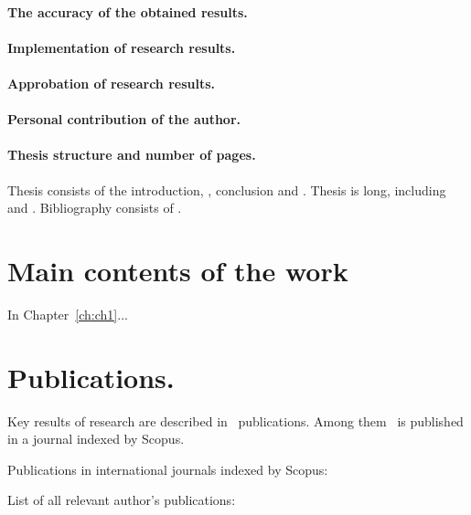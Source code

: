 \paragraph*{The accuracy of the obtained results.}

\paragraph*{Implementation of research results.}
\paragraph*{Approbation of research results.}
\paragraph*{Personal contribution of the author.}
\paragraph*{Thesis structure and number of pages.}

Thesis consists of the introduction,
,
conclusion and 
.
Thesis is 
 long, including
 and
.
Bibliography consists of
.


\newpage
\section*{Main contents of the work}

In Chapter~\ref{ch:ch1}...

\section*{Publications.}

Key results of research are described in \theAllMyPapers~publications. 
Among them
\theScopusPapers~is published in a journal indexed by Scopus. 



Publications in international journals indexed by Scopus:
\begin{refsection}
\nocite{*}
\printbibliography[
    keyword=scopus,
    heading=none,
    resetnumbers=true
]
\end{refsection}


List of all relevant author's publications:
\begin{refsection}
\nocite{*}
\printbibliography[
    keyword=own,
    heading=none,
    resetnumbers=true
]
\end{refsection}
